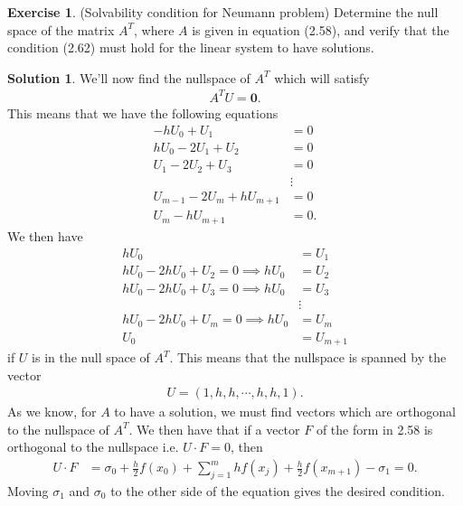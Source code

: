 \documentclass[12pt]{article}
\renewcommand{\vec}[1]{\mathbf{#1}}
\theoremstyle{definition}
\newtheorem{exer}{Exercise}
\newtheorem{sol}{Solution}
\theoremstyle{remark}
\begin{document}
\newpage

\begin{exer}
 (Solvability condition for Neumann problem)
Determine the null space of the matrix $A^T$, where $A$ is given in
equation (2.58), and verify that the condition (2.62) must hold for the
linear system to have solutions.
\end{exer}

\begin{sol}
    We'll now find the nullspace of $A^{T}$ which will satisfy
    \begin{align*}
    A^{T} U = \vec{0}.
    \end{align*}
    This means that we have the following equations
    \begin{align*}
        -h U_{0} + U_{1} &= 0\\
        h U_{0} - 2 U_{1} + U_{2} &= 0\\
        U_{1} - 2U_{2} + U_{3} &= 0 \\
                                  &\vdots\\  
        U_{m-1} - 2 U_{m} + hU_{m+1} &= 0\\
        U_{m} - h U_{m+1} &= 0.
    \end{align*}
    We then have
    \begin{align*}
        hU_{0} &= U_{1}\\
        h U_{0} - 2h U_{0} + U_{2} = 0 \implies h U_{0} &= U_{2}\\
        h U_{0} - 2 h U_{0} + U_{3} = 0 \implies h U_{0} &= U_{3}\\
                                                         &\vdots \\
        h U_{0} - 2h U_{0} + U_{m} = 0 \implies   h U_{0} &= U_{m}\\
                                                    U_{0} &= U_{m+1}
    \end{align*}
    if $U$ is in the null space of $A^{T}$. This means that the nullspace is spanned by the vector
    \begin{align*}
        U = (1, h, h, \cdots, h, h, 1).
    \end{align*}
    As we know, for $A$ to have a solution, we must find vectors which are orthogonal to the nullspace of $A^{T}$. We then have that if a vector $F$ of the form in 2.58 is orthogonal to the nullspace i.e. $U \cdot F = 0$, then
    \begin{align*}
        U \cdot F &= \sigma_{0} + \frac{h}{2} f(x_{0}) + \sum_{j = 1}^{m} h f(x_{j}) +  \frac{h}{2} f(x_{m+1}) - \sigma_{1} = 0.
    \end{align*}
    Moving $\sigma_{1}$ and $\sigma_{0}$ to the other side of the equation gives the desired condition. 

\end{sol}
\end{document}
